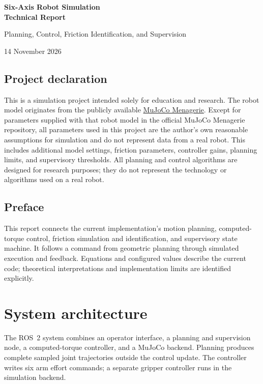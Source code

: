 \documentclass[11pt,a4paper]{report}
\begin{document}
\begin{center}
{\LARGE\bfseries Six-Axis Robot Simulation\\Technical Report}\par
\vspace{4mm}
{\large Planning, Control, Friction Identification, and Supervision}\par
14 November 2026
\end{center}

\section*{Project declaration}
This is a simulation project intended solely for education and research.
The robot model originates from the publicly available
\href{https://github.com/google-deepmind/mujoco_menagerie}{MuJoCo Menagerie}.
Except for parameters supplied with that robot model in the official
MuJoCo Menagerie repository, all parameters used in this project are the
author's own reasonable assumptions for simulation and do not represent
data from a real robot. This includes additional model settings, friction
parameters, controller gains, planning limits, and supervisory thresholds.
All planning and control algorithms are designed for research purposes;
they do not represent the technology or algorithms used on a real robot.

\section*{Preface}
This report connects the current implementation's motion planning,
computed-torque control, friction simulation and identification, and
supervisory state machine. It follows a command from geometric planning
through simulated execution and feedback. Equations and configured values
describe the current code; theoretical interpretations and implementation
limits are identified explicitly.

\tableofcontents
\chapter{System architecture}\label{ch:architecture}
The ROS~2 system combines an operator interface, a planning and supervision
node, a computed-torque controller, and a MuJoCo backend. Planning produces
complete sampled joint trajectories outside the control update. The
controller writes six arm effort commands; a separate gripper controller
runs in the simulation backend.
\end{document}
